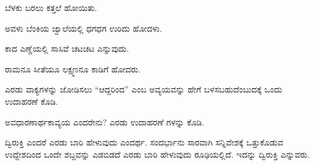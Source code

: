 \vspace{2.5pt plus 3pt minus 0.5pt}\noindent\hspace*{1.2em}\hspace{0.55em}ಬೆಳಕು ಬರಲು ಕತ್ತಲೆ ಹೋಯಿತು.\par

\vspace{2.5pt plus 3pt minus 0.5pt}\noindent\hspace*{1.2em}\hspace{0.55em}ಅವಳು ಬೆಂಕಿಯ ಜ್ವಾಲೆಯಲ್ಲಿ ಧಗಧಗ ಉರಿದು ಹೋದಳು.\par

\vspace{2.5pt plus 3pt minus 0.5pt}\noindent\hspace*{1.2em}\hspace{0.55em}ಕಾದ ಎಣ್ಣೆಯಲ್ಲಿ ಸಾಸಿವೆ ಚಟಚಟ ಎನ್ನುವುದು.\par

\vspace{2.5pt plus 3pt minus 0.5pt}\noindent\hspace*{1.2em}\hspace{0.55em}ರಾಮನೂ ಸೀತೆಯೂ ಲಕ್ಷ್ಮಣನೂ ಕಾಡಿಗೆ ಹೋದರು.\par

\vspace{2.5pt plus 3pt minus 0.5pt}\noindent\hspace*{1.2em}\hspace{0.55em}ಎರಡು ವಾಕ್ಯಗಳನ್ನು ಜೋಡಿಸಲು “ಆದ್ದರಿಂದ” ಎಂಬ ಅವ್ಯಯವನ್ನು ಹೇಗೆ ಬಳಸಬಹುದೆಂಬುದಕ್ಕೆ ಒಂದು ಉದಾಹರಣೆ ಕೊಡಿ.\par

\vspace{2.5pt plus 3pt minus 0.5pt}\noindent\hspace*{1.2em}\hspace{0.55em}ಅವಧಾರಣಾರ್ಥಕಾವ್ಯಯ ಎಂದರೇನು? ಎರಡು ಉದಾಹರಣೆ ಗಳನ್ನು ಕೊಡಿ.\par


\indent ದ್ವಿರುಕ್ತಿ ಎಂದರೆ ಎರಡು ಬಾರಿ ಹೇಳುವುದು ಎಂದರ್ಥ. ಸಂದರ್ಭಾನು ಸಾರವಾಗಿ ಸನ್ನಿವೇಶಕ್ಕೆ ಒತ್ತುಕೊಡುವ ಉದ್ದೇಶದಿಂದ ಒಂದೇ ಶಬ್ದವನ್ನು ಎಡಬಿಡದೆ ಎರಡು ಬಾರಿ ಹೇಳುವುದು ರೂಢಿಯಲ್ಲಿದೆ. ಇದನ್ನು ದ್ವಿರುಕ್ತಿ ಎನ್ನುವರು.\par

\vspace{3pt plus 2pt}\noindent\hspace*{1.2em}\par\vspace{1pt}

